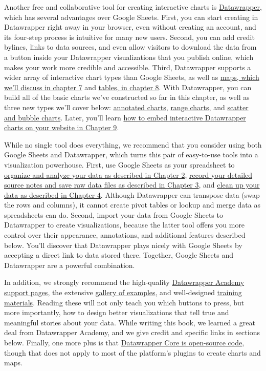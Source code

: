 \documentclass[
  english,
]{book}
\begin{document}
Another free and collaborative tool for creating interactive charts is \href{https://www.datawrapper.de/}{Datawrapper}, which has several advantages over Google Sheets. First, you can start creating in Datawrapper right away in your browser, even without creating an account, and its four-step process is intuitive for many new users. Second, you can add credit bylines, links to data sources, and even allow visitors to download the data from a button inside your Datawrapper visualizations that you publish online, which makes your work more credible and accessible. Third, Datawrapper supports a wider array of interactive chart types than Google Sheets, as well as \href{map.html}{maps, which we'll discuss in chapter 7} and \href{table.html}{tables, in chapter 8}. With Datawrapper, you can build all of the basic charts we've constructed so far in this chapter, as well as three new types we'll cover below: \href{annotated-datawrapper.html}{annotated charts}, \href{range-datawrapper.html}{range charts}, and \href{scatter-bubble-datawrapper.html}{scatter and bubble charts}. Later, you'll learn \href{embed.html}{how to embed interactive Datawrapper charts on your website in Chapter 9}.

While no single tool does everything, we recommend that you consider using both Google Sheets and Datawrapper, which turns this pair of easy-to-use tools into a visualization powerhouse. First, use Google Sheets as your spreadsheet to \href{spreadsheet.html}{organize and analyze your data as described in Chapter 2}, \href{find.html}{record your detailed source notes and save raw data files as described in Chapter 3}, and \href{clean.html}{clean up your data as described in Chapter 4}. Although Datawrapper can transpose data (swap the rows and columns), it cannot create pivot tables or lookup and merge data as spreadsheets can do. Second, import your data from Google Sheets to Datawrapper to create visualizations, because the latter tool offers you more control over their appearance, annotations, and additional features described below. You'll discover that Datawrapper plays nicely with Google Sheets by accepting a direct link to data stored there. Together, Google Sheets and Datawrapper are a powerful combination.

In addition, we strongly recommend the high-quality \href{https://academy.datawrapper.de/}{Datawrapper Academy support pages}, the extensive \href{https://www.datawrapper.de/charts/}{gallery of examples}, and well-designed \href{https://www.datawrapper.de/training-materials/}{training materials}. Reading these will not only teach you which buttons to press, but more importantly, how to design better visualizations that tell true and meaningful stories about your data. While writing this book, we learned a great deal from Datawrapper Academy, and we give credit and specific links in sections below. Finally, one more plus is that \href{https://github.com/datawrapper/datawrapper}{Datawrapper Core is open-source code}, though that does not apply to most of the platform's plugins to create charts and maps.
\end{document}
